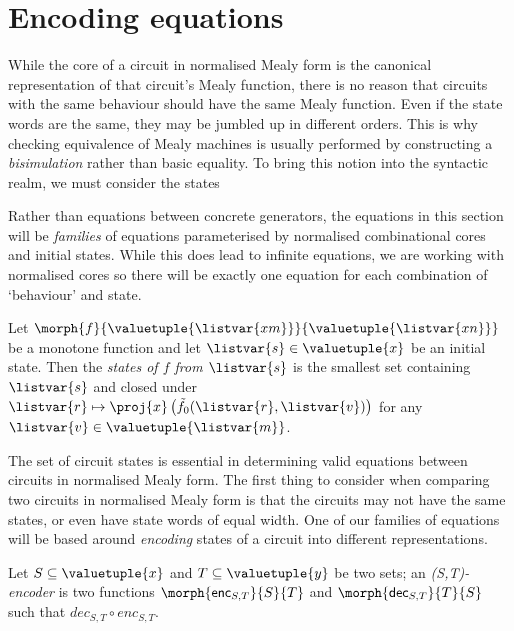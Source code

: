 \section{Encoding equations}

While the core of a circuit in normalised Mealy form is the canonical
representation of that circuit's Mealy function, there is no reason that
circuits with the same behaviour should have the same Mealy function.
Even if the state words are the same, they may be jumbled up in different
orders.
This is why checking equivalence of Mealy machines is usually performed by
constructing a \emph{bisimulation} rather than basic equality.
To bring this notion into the syntactic realm, we must consider the states

\begin{remark}
    Rather than equations between concrete generators, the equations in this
    section will be \emph{families} of equations parameterised by normalised
    combinational cores and initial states.
    While this does lead to infinite equations, we are working with normalised
    cores so there will be exactly one equation for each combination of
    `behaviour' and state.
\end{remark}

\begin{definition}[States]
    Let \(\morph{f}{\valuetuple{\listvar{xm}}}{\valuetuple{\listvar{xn}}}\) be a
    monotone function and let \(\listvar{s} \in  \valuetuple{x}\) be an
    initial state.
    Then the \emph{states of \(f\) from \(\listvar{s}\)} is the smallest set
    containing \(\listvar{s}\) and closed under \(
    \listvar{r}
    \mapsto
    \proj{x}\left(\tilde{f}_0(\listvar{r},\listvar{v})\right)
    \) for any \(\listvar{v} \in \valuetuple{\listvar{m}}\).
\end{definition}

The set of circuit states is essential in determining valid equations between
circuits in normalised Mealy form.
The first thing to consider when comparing two circuits in normalised Mealy
form is that the circuits may not have the same states, or even have state words
of equal width.
One of our families of equations will be based around \emph{encoding} states
of a circuit into different representations.

\begin{definition}[Encoder]\label{def:encoder}
    Let \(S \subseteq \valuetuple{x}\) and \(T \subseteq \valuetuple{y}\) be two
    sets; an \emph{(S,T)-encoder} is two functions \(
    \morph{\mathsf{enc}_{S,T}}{S}{T}
    \) and \(
    \morph{\mathsf{dec}_{S,T}}{T}{S}
    \) such that \(dec_{S,T} \circ enc_{S,T}\).
\end{definition}

